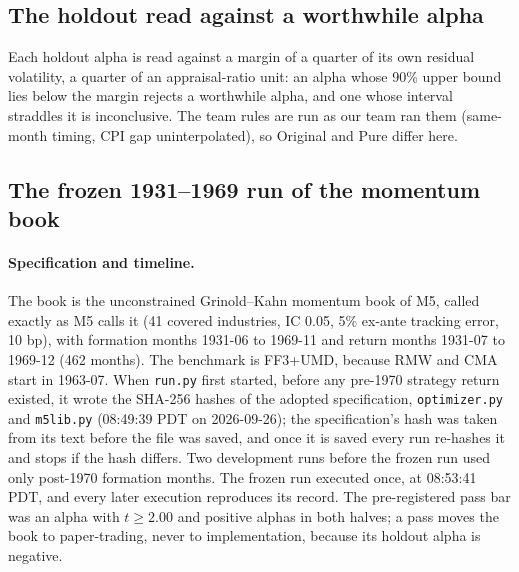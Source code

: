 \subsection{The holdout read against a worthwhile alpha}
Each holdout alpha is read against a margin of a quarter of its own residual volatility, a quarter of an appraisal-ratio unit: an alpha whose 90\% upper bound lies below the margin rejects a worthwhile alpha, and one whose interval straddles it is inconclusive. The team rules are run as our team ran them (same-month timing, CPI gap uninterpolated), so Original and Pure differ here.

\begin{table}[H]
\caption{Holdout (2022-08 to 2026-07, 48 months) alphas read against the margin. Every attention rule rejects a worthwhile alpha under both factor models; the momentum books and the EPA spread are inconclusive, because 48 months cannot tell 0\% from 3\% for them.}
\label{tab:m7holdout}
\centering\footnotesize

\end{table}

\subsection{The frozen 1931--1969 run of the momentum book}
\label{app:m7frozen}
\paragraph{Specification and timeline.} The book is the unconstrained Grinold--Kahn momentum book of M5, called exactly as M5 calls it (41 covered industries, IC 0.05, 5\% ex-ante tracking error, 10 bp), with formation months 1931-06 to 1969-11 and return months 1931-07 to 1969-12 (462 months). The benchmark is FF3+UMD, because RMW and CMA start in 1963-07. When \texttt{run.py} first started, before any pre-1970 strategy return existed, it wrote the SHA-256 hashes of the adopted specification, \texttt{optimizer.py} and \texttt{m5lib.py} (08:49:39 PDT on 2026-09-26); the specification's hash was taken from its text before the file was saved, and once it is saved every run re-hashes it and stops if the hash differs. Two development runs before the frozen run used only post-1970 formation months. The frozen run executed once, at 08:53:41 PDT, and every later execution reproduces its record. The pre-registered pass bar was an alpha with $t\ge2.00$ and positive alphas in both halves; a pass moves the book to paper-trading, never to implementation, because its holdout alpha is negative.

